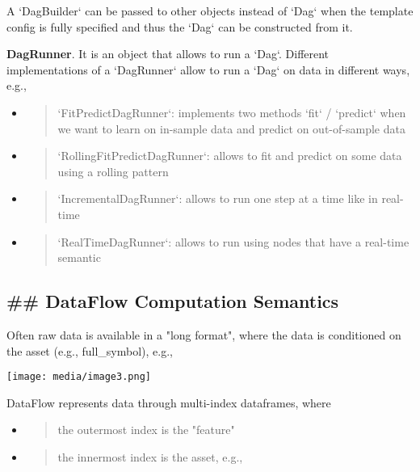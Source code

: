 \documentclass[11pt, reqno]{amsart}
\begin{document}
A `DagBuilder` can be passed to other objects instead of `Dag` when the
template config is fully specified and thus the `Dag` can be constructed
from it.

\textbf{DagRunner}. It is an object that allows to run a `Dag`.
Different implementations of a `DagRunner` allow to run a `Dag` on data
in different ways, e.g.,

\begin{itemize}
\item
  \begin{quote}
  `FitPredictDagRunner`: implements two methods `fit` / `predict` when
  we want to learn on in-sample data and predict on out-of-sample data
  \end{quote}
\item
  \begin{quote}
  `RollingFitPredictDagRunner`: allows to fit and predict on some data
  using a rolling pattern
  \end{quote}
\item
  \begin{quote}
  `IncrementalDagRunner`: allows to run one step at a time like in
  real-time
  \end{quote}
\item
  \begin{quote}
  `RealTimeDagRunner`: allows to run using nodes that have a real-time
  semantic
  \end{quote}
\end{itemize}

\hypertarget{dataflow-computation-semantics}{%
\subsection{\#\# DataFlow Computation
Semantics}\label{dataflow-computation-semantics}}

Often raw data is available in a "long format", where the data is
conditioned on the asset (e.g., full\_symbol), e.g.,

\texttt{[image: media/image3.png]}

DataFlow represents data through multi-index dataframes, where

\begin{itemize}
\item
  \begin{quote}
  the outermost index is the "feature"
  \end{quote}
\item
  \begin{quote}
  the innermost index is the asset, e.g.,
  \end{quote}
\end{itemize}
\end{document}
